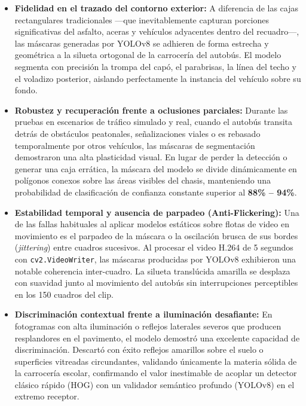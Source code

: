 \documentclass[12pt]{article}
\begin{document}
\begin{itemize}
    \item \textbf{Fidelidad en el trazado del contorno exterior:} A diferencia de las cajas rectangulares tradicionales —que inevitablemente capturan porciones significativas del asfalto, aceras y vehículos adyacentes dentro del recuadro—, las máscaras generadas por YOLOv8 se adhieren de forma estrecha y geométrica a la silueta ortogonal de la carrocería del autobús. El modelo segmenta con precisión la trompa del capó, el parabrisas, la línea del techo y el voladizo posterior, aislando perfectamente la instancia del vehículo sobre su fondo.
    \item \textbf{Robustez y recuperación frente a oclusiones parciales:} Durante las pruebas en escenarios de tráfico simulado y real, cuando el autobús transita detrás de obstáculos peatonales, señalizaciones viales o es rebasado temporalmente por otros vehículos, las máscaras de segmentación demostraron una alta plasticidad visual. En lugar de perder la detección o generar una caja errática, la máscara del modelo se divide dinámicamente en polígonos conexos sobre las áreas visibles del chasis, manteniendo una probabilidad de clasificación de confianza constante superior al \textbf{88\% -- 94\%}.
    \item \textbf{Estabilidad temporal y ausencia de parpadeo (Anti-Flickering):} Una de las fallas habituales al aplicar modelos estáticos sobre flotas de video en movimiento es el parpadeo de la máscara o la oscilación brusca de sus bordes (\emph{jittering}) entre cuadros sucesivos. Al procesar el video H.264 de 5 segundos con \texttt{cv2.VideoWriter}, las máscaras producidas por YOLOv8 exhibieron una notable coherencia inter-cuadro. La silueta translúcida amarilla se desplaza con suavidad junto al movimiento del autobús sin interrupciones perceptibles en los 150 cuadros del clip.
    \item \textbf{Discriminación contextual frente a iluminación desafiante:} En fotogramas con alta iluminación o reflejos laterales severos que producen resplandores en el pavimento, el modelo demostró una excelente capacidad de discriminación. Descartó con éxito reflejos amarillos sobre el suelo o superficies vitreadas circundantes, validando únicamente la materia sólida de la carrocería escolar, confirmando el valor inestimable de acoplar un detector clásico rápido (HOG) con un validador semántico profundo (YOLOv8) en el extremo receptor.
\end{itemize}
\end{document}
